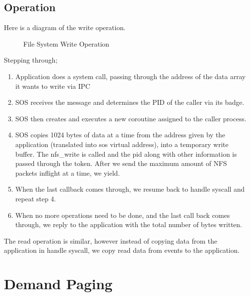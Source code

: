 \documentclass[12pt]{article}
\begin{document}
\subsection{Operation}
Here is a diagram of the write operation.
\begin{figure}[htbp]
\centering
\caption{File System Write Operation}
\end{figure}
Stepping through;
\begin{enumerate}
\item Application does a system call, passing through the address of the data array it wants to write via IPC
\item SOS receives the message and determines the PID of the caller via its badge.
\item SOS then creates and executes a new coroutine assigned to the caller process.
\item SOS copies 1024 bytes of data at a time from the address given by the application (translated into sos virtual address), into a temporary write buffer. The nfs\_write is called and the pid along with other information is passed through the token. After we send the maximum amount of NFS packets inflight at a time, we yield.
\item When the last callback comes through, we resume back to handle syscall and repeat step 4.
\item When no more operations need to be done, and the last call back comes through, we reply to the application with the total number of bytes written.
\end{enumerate}

The read operation is similar, however instead of copying data from the application in handle syscall, we copy read data from events to the application.

\clearpage
\section{Demand Paging}
\end{document}
